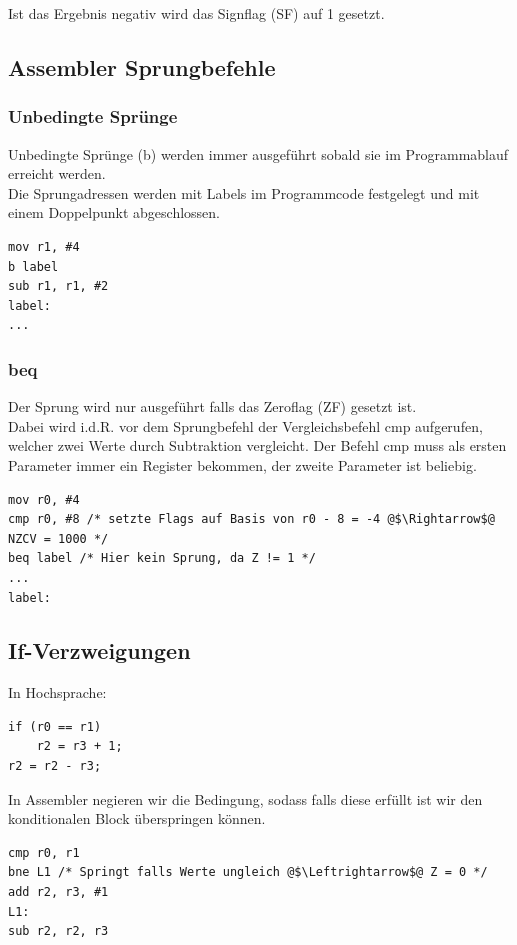 \documentclass[a4paper,12pt,leqno]{article}
\begin{document}
Ist das Ergebnis negativ wird das Signflag (SF) auf 1 gesetzt.

\subsection{Assembler Sprungbefehle}

\subsubsection{Unbedingte Sprünge}
Unbedingte Sprünge (b) werden immer ausgeführt sobald sie im Programmablauf erreicht werden.\\
Die Sprungadressen werden mit Labels im Programmcode festgelegt und mit einem Doppelpunkt abgeschlossen.
\begin{lstlisting}
mov r1, #4
b label
sub r1, r1, #2
label:
...
\end{lstlisting}

\subsubsection{beq}
Der Sprung wird nur ausgeführt falls das Zeroflag (ZF) gesetzt ist.\\
Dabei wird i.d.R. vor dem Sprungbefehl der Vergleichsbefehl cmp aufgerufen, welcher zwei Werte durch Subtraktion vergleicht.
Der Befehl cmp muss als ersten Parameter immer ein Register bekommen, der zweite Parameter ist beliebig.
\begin{lstlisting}
mov r0, #4
cmp r0, #8 /* setzte Flags auf Basis von r0 - 8 = -4 @$\Rightarrow$@ NZCV = 1000 */
beq label /* Hier kein Sprung, da Z != 1 */
...
label:
\end{lstlisting}

\subsection{If-Verzweigungen}
In Hochsprache:
\begin{lstlisting}
if (r0 == r1)
	r2 = r3 + 1;
r2 = r2 - r3;
\end{lstlisting}

In Assembler negieren wir die Bedingung, sodass falls diese erfüllt ist wir den konditionalen Block überspringen können.
\begin{lstlisting}
cmp r0, r1
bne L1 /* Springt falls Werte ungleich @$\Leftrightarrow$@ Z = 0 */
add r2, r3, #1
L1:
sub r2, r2, r3
\end{lstlisting}
\end{document}
